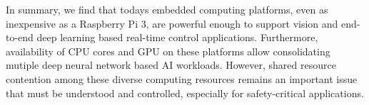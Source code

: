 


In summary, we find that todays embedded computing platforms, even as
inexpensive as a Raspberry Pi 3, are powerful enough to support
vision and end-to-end deep learning based real-time control
applications. Furthermore, availability of CPU cores and GPU on these
platforms allow consolidating mutiple deep neural network based AI
workloads. However, shared resource contention among these diverse
computing resources remains an important issue that must be understood
and controlled, especially for safety-critical applications.

